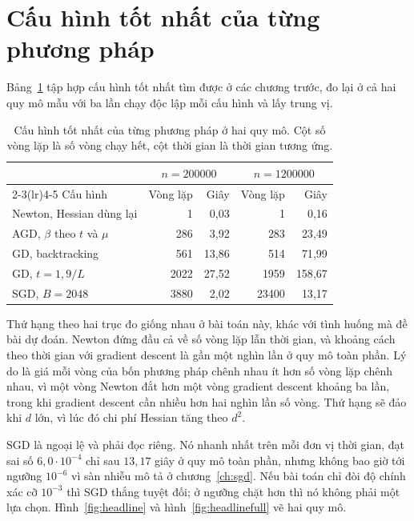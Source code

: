 \documentclass[12pt, a4paper, oneside]{report}
\theoremstyle{definition}
\begin{document}
\section{Cấu hình tốt nhất của từng phương pháp}

Bảng~\ref{tab:headline} tập hợp cấu hình tốt nhất tìm được ở các chương trước, đo
lại ở cả hai quy mô mẫu với ba lần chạy độc lập mỗi cấu hình và lấy trung vị.

\begin{table}[tbp]
  \centering
  \caption{Cấu hình tốt nhất của từng phương pháp ở hai quy mô. Cột số vòng lặp
    là số vòng chạy hết, cột thời gian là thời gian tương ứng.}
  \label{tab:headline}
  \begin{tabular}{lrrrr}
    \toprule
    & \multicolumn{2}{c}{$n = \num{200000}$} & \multicolumn{2}{c}{$n = \num{1200000}$} \\
    \cmidrule(lr){2-3}\cmidrule(lr){4-5}
    Cấu hình & Vòng lặp & Giây & Vòng lặp & Giây \\
    \midrule
    Newton, Hessian dùng lại        & 1     & 0{,}03  & 1     & 0{,}16  \\
    AGD, $\beta$ theo $t$ và $\mu$  & 286   & 3{,}92  & 283   & 23{,}49 \\
    GD, backtracking                & 561   & 13{,}86 & 514   & 71{,}99 \\
    GD, $t = 1{,}9/L$               & 2022  & 27{,}52 & 1959  & 158{,}67 \\
    SGD, $B = 2048$                 & 3880  & 2{,}02  & 23400 & 13{,}17 \\
    \bottomrule
  \end{tabular}
\end{table}

Thứ hạng theo hai trục đo giống nhau ở bài toán này, khác với tình huống mà đề
bài dự đoán. Newton đứng đầu cả về số vòng lặp lẫn thời gian, và khoảng cách
theo thời gian với gradient descent là gần một nghìn lần ở quy mô toàn phần. Lý
do là giá mỗi vòng của bốn phương pháp chênh nhau ít hơn số vòng lặp chênh nhau,
vì một vòng Newton đắt hơn một vòng gradient descent khoảng ba lần, trong khi
gradient descent cần nhiều hơn hai nghìn lần số vòng. Thứ hạng sẽ đảo khi $d$
lớn, vì lúc đó chi phí Hessian tăng theo $d^{2}$.

SGD là ngoại lệ và phải đọc riêng. Nó nhanh nhất trên mỗi đơn vị thời gian, đạt
sai số $6{,}0 \cdot 10^{-4}$ chỉ sau $13{,}17$ giây ở quy mô toàn phần, nhưng
không bao giờ tới ngưỡng $10^{-6}$ vì sàn nhiễu mô tả ở chương~\ref{ch:sgd}. Nếu
bài toán chỉ đòi độ chính xác cỡ $10^{-3}$ thì SGD thắng tuyệt đối; ở ngưỡng chặt
hơn thì nó không phải một lựa chọn. Hình~\ref{fig:headline} và
hình~\ref{fig:headlinefull} vẽ hai quy mô.
\end{document}
